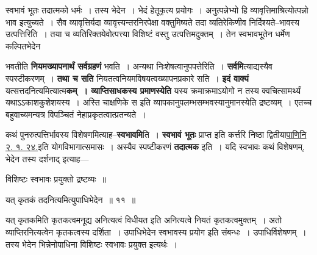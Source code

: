 \documentclass[article,12pt,a4paper]{memoir}
\begin{document}
	  \pstart स्वभावं भूतः तदात्मको धर्मः । तस्य भेदेन । भेदं हेतूकृत्य प्रयोगः । अनुत्पन्नेभ्यो हि व्यावृत्तिमाश्रित्योत्पन्नो भाव इत्युच्यते । सैव व्यावृत्तिर्यदा व्यावृत्त्यन्तरनिरपेक्षा वक्तुमिष्यते तदा व्यतिरेकिणीव निर्दिश्यते--भावस्य उत्पत्तिरिति । तया च व्यतिरिक्तयेवोत्पत्त्या विशिष्टं वस्तु उत्पत्तिमदुक्तम् । तेन स्वभावभूतेन धर्मेण कल्पितभेदेन
	\pend
      
	  \endgroup
	

	  \pstart भवतीति \textbf{नियमख्यापनार्थं सर्वग्रहणं} भवति । अन्यथा निःशेषत्वानुपपत्तेरिति । \textbf{सर्वमि}त्याद्यस्यैव स्पस्टीकरणम् । \textbf{तथा च सति} नियतत्वनियमविषयत्वख्यापनप्रकारे सति । \textbf{इदं वाक्यं} यत्सत्तदनित्यमित्यात्म\textbf{कम् । व्याप्तिसाधकस्य प्रमाणस्येति} यस्य क्रमाक्रमाऽयोगो न तस्य क्वचित्सामर्थ्यं यथाऽऽकाशकुशेशयस्य । अस्ति चाक्षणिके स इति व्यापकानुपलम्भसम्भवस्यानुमानस्येति द्रष्टव्यम् । एतच्च बहुवाच्यमन्यत्र विपञ्चितं नेहाप्रकृतत्वात्प्रतन्यते ।
	\pend
      

	  \pstart कथं पुनरुत्पत्तिर्भावस्य विशेषणमित्याह--\textbf{स्वभावमि}ति । \textbf{स्वभावं भूतः} प्राप्त इति कर्त्तरि निष्ठा द्वितीया\href{http://sarit.indology.info/?cref=Pā.2.1.24}{पाणिनि २. १. २४.}इति योगविभागा\leavevmode{}त्समासः । अस्यैव स्पष्टीकरणं \textbf{तदात्मक} इति । यदि स्वभावः कथं विशेषणम्, भेदेन तस्य दर्शनाद् इत्याह—  \leavevmode{} 
	  
	विशिष्टः स्वभावः प्रयुक्तो द्रष्टव्यः ॥  
	  
	यत् कृतकं तदनित्यमित्युपाधिभेदेन ॥ ११ ॥ 
	  
	यत् कृतकमिति कृतकत्वमनूद्य अनित्यत्वं विधीयत इति अनित्यत्वे नियतं कृतकत्वमुक्तम् । अतो व्याप्तिरनित्यत्वेन कृतकत्वस्य दर्शिता । उपाधिभेदेन स्वभावस्य प्रयोग इति संबन्धः । उपाधिर्विशेषणम् । तस्य भेदेन भिन्नेनोपाधिना विशिष्टः स्वभावः प्रयुक्त इत्यर्थः ।  
	  
\end{document}
